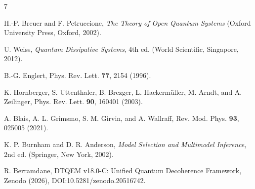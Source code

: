 \documentclass[aps,pra,reprint,amsmath,amssymb,superscriptaddress]{revtex4-2}
\begin{document}
\begin{thebibliography}{7}

H.-P. Breuer and F. Petruccione, \textit{The Theory of Open Quantum Systems} (Oxford University Press, Oxford, 2002).

U. Weiss, \textit{Quantum Dissipative Systems}, 4th ed. (World Scientific, Singapore, 2012).

B.-G. Englert, Phys. Rev. Lett. \textbf{77}, 2154 (1996).

K. Hornberger, S. Uttenthaler, B. Brezger, L. Hackerm\"uller, M. Arndt, and A. Zeilinger, Phys. Rev. Lett. \textbf{90}, 160401 (2003).

A. Blais, A. L. Grimsmo, S. M. Girvin, and A. Wallraff, Rev. Mod. Phys. \textbf{93}, 025005 (2021).

K. P. Burnham and D. R. Anderson, \textit{Model Selection and Multimodel Inference}, 2nd ed. (Springer, New York, 2002).

R. Berramdane, DTQEM v18.0-C: Unified Quantum Decoherence Framework, Zenodo (2026), DOI:10.5281/zenodo.20516742.

\end{thebibliography}
\end{document}
